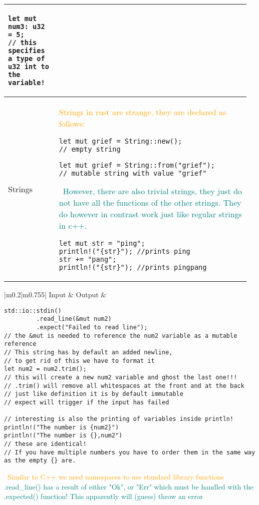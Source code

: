 \documentclass[main.tex,fontsize=8pt,paper=a4,paper=portrait,DIV=calc,]{scrartcl}
\begin{document}
\begin{table}[h!]
\begin{tabular}{|m{0.2\linewidth}|m{0.755\linewidth}|}
\begin{lstlisting}
let mut num3: u32 = 5;
// this specifies a type of u32 int to the variable!
\end{lstlisting}\\
\hline
Strings & 
\textcolor{orange}{Strings in rust are strange, they are declared as follows:}\newline
\begin{lstlisting}
let mut grief = String::new();
// empty string

let mut grief = String::from("grief");
// mutable string with value "grief"
\end{lstlisting}
\, \newline
\textcolor{teal}{However, there are also trivial strings, they just do not have all the functions of the other strings.\newline
They do however in contrast work just like regular strings in c++.}\newline
\begin{lstlisting}
let mut str = "ping";
println!("{str}"); //prints ping
str += "pang";
println!("{str}"); //prints pingpang
\end{lstlisting}\\
\hline
\end{tabular}
\end{table}
\pagebreak
\begin{table}[ht!]
\begin{tabular}{|m{0.2\linewidth}|m{0.755\linewidth}|}
\hline
Input \& Output & 
\begin{lstlisting}
std::io::stdin()
         .read_line(&mut num2)
         .expect("Failed to read line");
// the &mut is needed to reference the num2 variable as a mutable reference
// This string has by default an added newline,
// to get rid of this we have to format it
let num2 = num2.trim();
// this will create a new num2 variable and ghost the last one!!!
// .trim() will remove all whitespaces at the front and at the back
// just like definition it is by default immutable
// expect will trigger if the input has failed

// interesting is also the printing of variables inside println!
println!("The number is {num2}")
println!("The number is {},num2")
// these are identical! 
// If you have multiple numbers you have to order them in the same way as the empty {} are.
\end{lstlisting}
\, \newline
\textcolor{orange}{Similar to C++ we need namespaces to use standard library functions}\newline
\textcolor{teal}{.read\_line() has a result of either "Ok", or "Err" which must be handled with the .expected() function! \newline
This apparently will (guess) throw an error}\\
\hline
\end{tabular}
\end{table}
\end{document}
